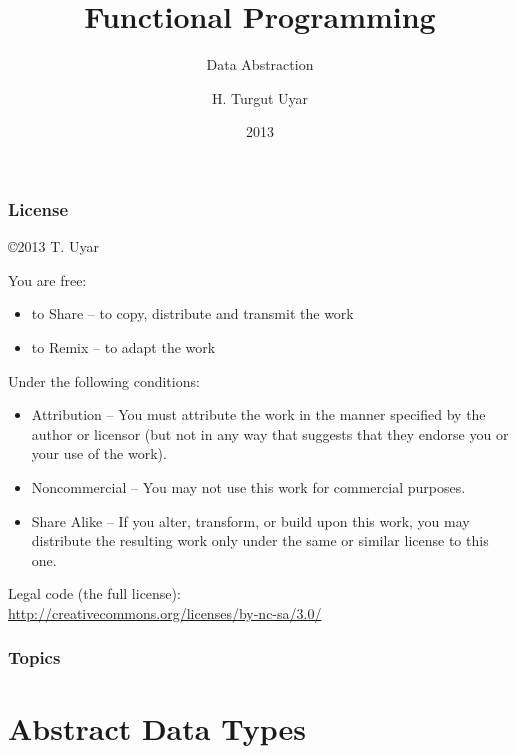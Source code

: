 \documentclass[dvipsnames]{beamer}
\title{Functional Programming}
\subtitle{Data Abstraction}
\author{H. Turgut Uyar}
\date{2013}
\theoremstyle{plain}
\begin{document}
\begin{frame}
  \titlepage
\end{frame}

\begin{frame}
  \frametitle{License}

  \hfill
  \copyright 2013 T. Uyar

  \vfill
  \begin{tiny}
    You are free:
    \begin{itemize}
      \item to Share -- to copy, distribute and transmit the work
      \item to Remix -- to adapt the work
    \end{itemize}

    Under the following conditions:
    \begin{itemize}
      \item Attribution -- You must attribute the work in the manner specified by
        the author or licensor (but not in any way that suggests that they
        endorse you or your use of the work).

      \item Noncommercial -- You may not use this work for commercial purposes.

      \item Share Alike -- If you alter, transform, or build upon this work, you
        may distribute the resulting work only under the same or similar license
        to this one.
    \end{itemize}
  \end{tiny}

  \vfill
  Legal code (the full license):\\
  \url{http://creativecommons.org/licenses/by-nc-sa/3.0/}
\end{frame}

\begin{frame}
  \frametitle{Topics}
  \tableofcontents
\end{frame}

\section{Abstract Data Types}
\end{document}

